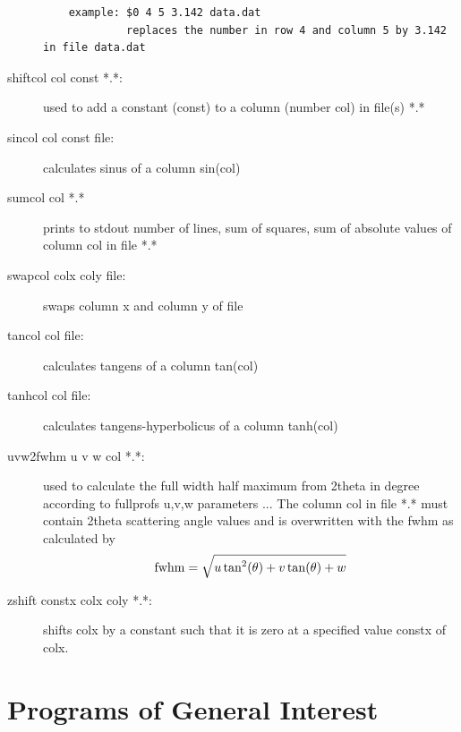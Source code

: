 \begin{description}
\begin{verbatim}
    example: $0 4 5 3.142 data.dat
             replaces the number in row 4 and column 5 by 3.142 in file data.dat
\end{verbatim}
\item [\prg shiftcol\index{shiftcol} col const *.*:] used to add a constant (const) to a column %
(number col) in file(s) *.*
\item [\prg sincol\index{sincol} col const file:] calculates sinus of a column sin(col) 
\item [\prg sumcol\index{sumcol} col *.*] prints to stdout number of lines, sum of squares, sum %
of absolute values of column col in file *.*
\item [\prg swapcol\index{swapcol} colx coly file:] swaps column x and column y of file
\item [\prg tancol\index{tancol} col file:] calculates tangens of a column tan(col)
\item [\prg tanhcol\index{tanhcol} col file:] calculates tangens-hyperbolicus of a column tanh(col)
\item [\prg uvw2fwhm\index{uvw2fwhm} u v w col *.*:] used to calculate the full
                   width half maximum from
                   2theta in degree according to fullprofs u,v,w parameters ...
                  The column col in file *.* must contain 2theta scattering angle
                 values and is overwritten with the fwhm as calculated by
                  \begin{equation}
                     {\rm  fwhm }= \sqrt {u \tan^2(\theta) + v \tan(\theta) + w}
                \end{equation}
\item [\prg zshift\index{zshift} constx colx coly *.*:] shifts colx by a constant such that it %
is zero at a specified value constx of colx. 
\end{description}

\section{Programs of General Interest}

